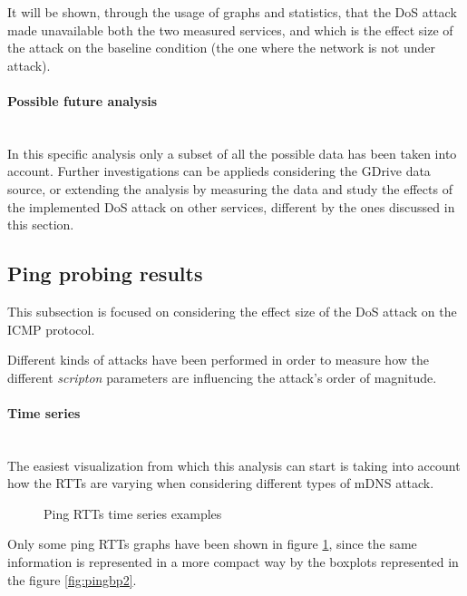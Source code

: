 \documentclass[fleqn, 11pt]{SelfArx} %
\begin{document}
It will be shown, through the usage of graphs and statistics, that the DoS attack made unavailable both the two measured services, and which is the effect size of the attack on the baseline condition (the one where the network is not under attack).
\paragraph{Possible future analysis}\mbox{}\\
In this specific analysis only a subset of all the possible data has been taken into account.
Further investigations can be applieds considering the GDrive data source, or extending the analysis by measuring the data and study the effects of the implemented DoS attack on other services, different by the ones discussed in this section.

\subsection{Ping probing results}
This subsection is focused on considering the effect size of the DoS attack on the ICMP protocol.

Different kinds of attacks have been performed in order to measure how the different {\it{scripton}} parameters are influencing the attack's order of magnitude.

\paragraph{Time series}\mbox{}\\
The easiest visualization from which this analysis can start is taking into account how the RTTs are varying when considering different types of mDNS attack.

\begin{figure}
    \centering
    \qquad
    \caption{Ping RTTs time series examples}%
    \label{fig:rtts-time-series}%
\end{figure}
Only some ping RTTs graphs have been shown in figure \ref{fig:rtts-time-series}, since the same information is represented in a more compact way by the boxplots represented in the figure \ref{fig:pingbp2}.
\end{document}
